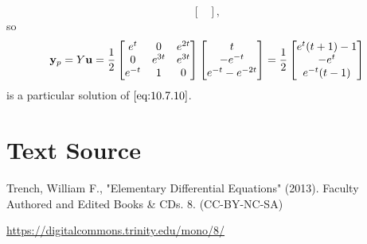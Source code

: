 \documentclass{ximera}
\begin{document}
\begin{example}
\begin{explanation}
$$\begin{bmatrix}
\end{bmatrix},
$$
so
$$
{\bf y}_p=Y{\bf u}=
\frac{1}{2}\begin{bmatrix}e^t&0&e^{2t}\\0&e^{3t}&e^{3t}\\e^{-t}&1&0
\end{bmatrix}
\begin{bmatrix}t\\-e^{-t}\\e^{-t}-e^{-2t}
\end{bmatrix}=\frac{1}{2}\begin{bmatrix}e^t(t+1)-1\\
-e^t\\e^{-t}(t-1)\end{bmatrix}
$$
is a particular solution of  $\eqref{eq:10.7.10}$.
\end{explanation}
\end{example}

\section*{Text Source}
Trench, William F., "Elementary Differential Equations" (2013). Faculty Authored and Edited Books \& CDs. 8. (CC-BY-NC-SA)

\href{https://digitalcommons.trinity.edu/mono/8/}{https://digitalcommons.trinity.edu/mono/8/}
\end{document}
